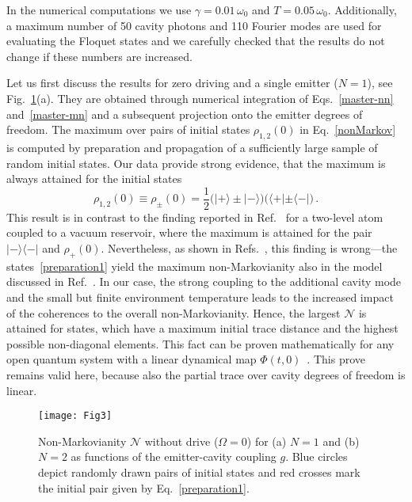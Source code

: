 \documentclass[aps,pra,twocolumn,showpacs,showkeys,10pt,nofootinbib]{revtex4-1}
\begin{document}
In the numerical computations we use $\gamma=0.01\,\omega_0$ and $T=0.05\,\omega_0$.
Additionally, a maximum number of 50 cavity photons and 110 Fourier modes are used for evaluating the Floquet states and we carefully checked that the results do not change if these numbers are increased.

Let us first discuss the results for zero driving and a single emitter ($N=1$), see Fig.~\ref{fig:nonMarkov_nd}(a).
They are obtained through numerical integration of Eqs.~\eqref{master-nn} and~\eqref{master-mn} and a subsequent projection onto the emitter degrees of freedom.
The maximum over pairs of initial states $\rho_{1,2}(0)$ in Eq.~\eqref{nonMarkov} is computed by preparation and propagation of a sufficiently large sample of random initial states.
Our data provide strong evidence, that the maximum is always attained for the initial states
\begin{equation}\label{preparation1}
  \rho_{1,2}(0) \equiv \rho_\pm(0) = \frac{1}{2} \big( | + \rangle \pm | - \rangle \big) \big( \langle + | \pm \langle - | \big) \,.
\end{equation}
This result is in contrast to the finding reported in Ref.~\cite{lpb10} for a two-level atom coupled to a vacuum reservoir, where the maximum is attained for the pair $|-\rangle\langle-|$ and $\rho_+(0)$.
Nevertheless, as shown in Refs.~\cite{xyf10, blpv16}, this finding is wrong---the states~\eqref{preparation1} yield the maximum non-Markovianity also in the model discussed in Ref.~\cite{lpb10}.
In our case, the strong coupling to the additional cavity mode and the small but finite environment temperature leads to the increased impact of the coherences to the overall non-Markovianity.
Hence, the largest $\mathcal{N}$ is attained for states, which have a maximum initial trace distance and the highest possible non-diagonal elements.
This fact can be proven mathematically for any open quantum system with a linear dynamical map $\Phi(t,0)$~\cite{wklpb12}.
This prove remains valid here, because also the partial trace over cavity degrees of freedom is linear.

\begin{figure}
  \texttt{[image: Fig3]}
  \caption{\label{fig:nonMarkov_nd}Non-Markovianity $\mathcal{N}$ without drive ($\Omega=0$) for (a) $N=1$ and (b) $N=2$ as functions of the emitter-cavity coupling $g$.
    Blue circles depict randomly drawn pairs of initial states and red crosses mark the initial pair given by Eq.~\eqref{preparation1}.}
\end{figure}
\end{document}
